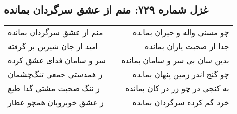 \begin{center}
\section*{غزل شماره ۷۲۹: منم از عشق سرگردان بمانده}
\label{sec:729}
\begin{longtable}{l p{0.5cm} r}
منم از عشق سرگردان بمانده
&&
چو مستی واله و حیران بمانده
\\
امید از جان شیرین بر گرفته
&&
جدا از صحبت یاران بمانده
\\
سر و سامان فدای عشق کرده
&&
بدین سان بی سر و سامان بمانده
\\
ز همدستی جمعی تنگ‌چشمان
&&
چو گنج اندر زمین پنهان بمانده
\\
ز ننگ صحبت مشتی گدا طبع
&&
به کنجی در چو زر در کان بمانده
\\
ز عشق خوبرویان همچو عطار
&&
خرد گم کرده سرگردان بمانده
\\
\end{longtable}
\end{center}
